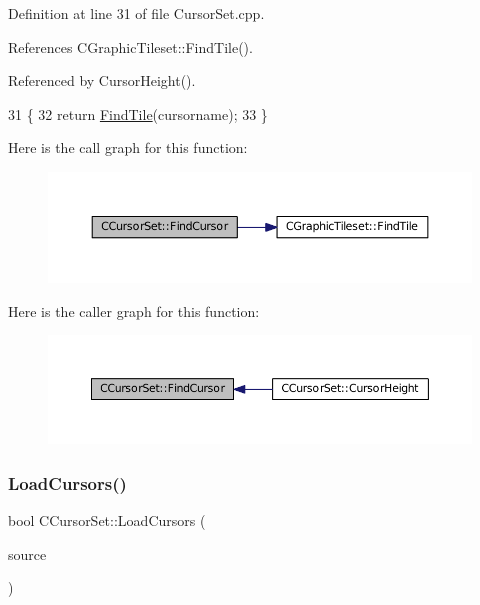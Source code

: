 Definition at line 31 of file Cursor\+Set.\+cpp.



References C\+Graphic\+Tileset\+::\+Find\+Tile().



Referenced by Cursor\+Height().


\begin{DoxyCode}
31                                                            \{
32     \textcolor{keywordflow}{return} \hyperlink{classCGraphicTileset_ab8f2c2b2f2095b17d53c3dc475d5685c}{FindTile}(cursorname);
33 \}
\end{DoxyCode}
Here is the call graph for this function\+:\nopagebreak
\begin{figure}[H]
\begin{center}
\leavevmode
\includegraphics[width=350pt]{classCCursorSet_a6a7ee8b41e6de490a7817b3f3ce5fb9f_cgraph}
\end{center}
\end{figure}
Here is the caller graph for this function\+:\nopagebreak
\begin{figure}[H]
\begin{center}
\leavevmode
\includegraphics[width=350pt]{classCCursorSet_a6a7ee8b41e6de490a7817b3f3ce5fb9f_icgraph}
\end{center}
\end{figure}
\hypertarget{classCCursorSet_abde01bde36a926de4d2de67e48be0cc0}{}\label{classCCursorSet_abde01bde36a926de4d2de67e48be0cc0} 
\subsubsection{\texorpdfstring{Load\+Cursors()}{LoadCursors()}}
{\footnotesize\ttfamily bool C\+Cursor\+Set\+::\+Load\+Cursors (\begin{DoxyParamCaption}\item[{std\+::shared\+\_\+ptr$<$ \hyperlink{classCDataSource}{C\+Data\+Source} $>$}]{source }\end{DoxyParamCaption})}



